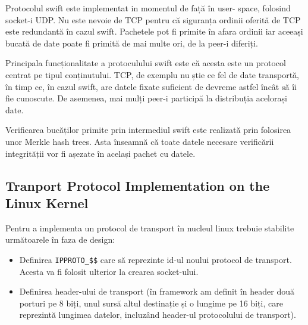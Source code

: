 Protocolul swift este implementat in momentul de față în user-
space, folosind socket-i UDP. Nu este nevoie de TCP pentru că siguranța
ordinii oferită de TCP este redundantă în cazul swift. Pachetele pot fi
primite în afara ordinii iar aceeași bucată de date poate fi primită de mai
multe ori, de la peer-i diferiți.

Principala funcționalitate a protoculului swift este că acesta este un
protocol centrat pe tipul conținutului. TCP, de exemplu nu știe ce fel de
date transportă, în timp ce, în cazul swift, are datele fixate suficient de
devreme astfel încât să îi fie cunoscute. De asemenea, mai mulți peer-i
participă la distribuția acelorași date.

Verificarea bucăților primite prin intermediul swift este realizată prin
folosirea unor Merkle hash trees. Asta înseamnă că toate datele necesare
verificării integrității vor fi așezate în același pachet cu datele.

\subsection{Tranport Protocol Implementation on the Linux Kernel}

Pentru a implementa un protocol de transport în nucleul linux
trebuie stabilite următoarele în faza de design:

\begin{itemize}
  \item Definirea \texttt{IPPROTO\_\$\$} care să reprezinte id-ul noului
  protocol de transport. Acesta va fi folosit ulterior la crearea socket-ului.
  \item Definirea header-ului de transport (în framework am definit în header
  două porturi pe 8 biți, unul sursă altul destinație și o lungime pe 16 biți,
  care reprezintă lungimea datelor, incluzând header-ul protocolului de
  transport).
\end{itemize}

